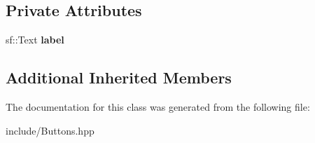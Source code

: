 \subsection*{Private Attributes}
\begin{DoxyCompactItemize}
\item 
\mbox{\label{class_text_button_af83f98d5e8997c8ddd7f47088ad6159b}} 
sf\+::\+Text {\bfseries label}
\end{DoxyCompactItemize}
\subsection*{Additional Inherited Members}


The documentation for this class was generated from the following file\+:\begin{DoxyCompactItemize}
\item 
include/Buttons.\+hpp\end{DoxyCompactItemize}
